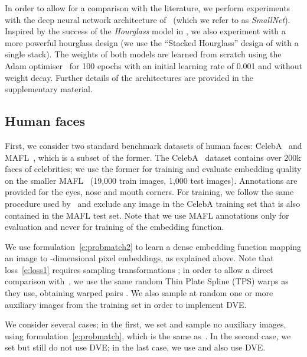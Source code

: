 \documentclass[10pt,twocolumn,letterpaper]{article}
\makeatletter
\renewcommand{\paragraph}{\@startsection{paragraph}{4}{\z@}{0.5em}{-1em}{\normalfont\normalsize\bfseries}}
\makeatother
\begin{document}
\paragraph{Implementation details.}\label{s:details}

In order to allow for a comparison with the literature, we perform experiments with the deep neural network architecture of~\cite{thewlis17Bunsupervised} (which we refer to as \textit{SmallNet}).  Inspired by the success of the \textit{Hourglass} model in  \cite{zhang2018unsupervised}, we also experiment with a more powerful hourglass design (we use the ``Stacked Hourglass'' design of \cite{newell2016stacked} with a single stack).  The weights of both models are learned from scratch using the Adam optimiser~\cite{kingma2014adam} for 100 epochs with an initial learning rate of 0.001 and without weight decay.  Further details of the architectures are provided in the supplementary material.

\subsection{Human faces}\label{s:human}

First, we consider two standard benchmark datasets of human faces: CelebA~\cite{liu2015faceattributes} and MAFL~\cite{Zhang2016}, which is a subset of the former.
The CelebA~\cite{liu2015faceattributes} dataset contains over 200k faces of celebrities; we use the former for training and evaluate embedding quality on the smaller MAFL~\cite{Zhang2016} (19,000 train images, 1,000 test images). Annotations are provided for the eyes, nose and mouth corners.
For training, we follow the same procedure used by~\cite{thewlis17Bunsupervised} and exclude any image in the CelebA training set that is also contained in the MAFL test set.
Note that we use MAFL annotations only for evaluation and never for training of the embedding function.


We use formulation~\eqref{e:probmatch2} to learn a dense embedding function  mapping an image  to -dimensional pixel embeddings, as explained above.
Note that loss~\eqref{e:loss1} requires sampling transformations ; in order to allow a direct comparison with~\cite{thewlis17Bunsupervised}, we use the same random Thin Plate Spline (TPS) warps as they use, obtaining warped pairs .  We also sample at random one or more auxiliary images  from the training set in order to implement {DVE}.

We consider several cases; in the first, we set  and sample no auxiliary images, using formulation~\eqref{e:probmatch}, which is the same as~\cite{thewlis17Bunsupervised}.
In the second case, we set  but still do not use {DVE}; in the last case, we use  and also use DVE.
\end{document}
